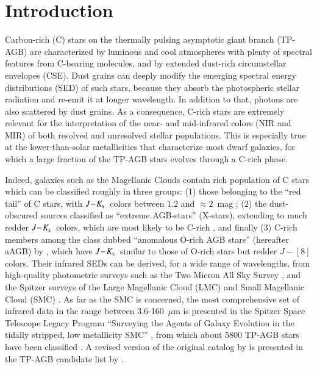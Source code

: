 \documentclass[useAMS,usenatbib]{mn2e/mn2e}
\newcommand{\jks}{\mbox{$J\!-\!K_{\rm s}$}}
\begin{document}
\section{Introduction}
\label{introduction}
Carbon-rich (C) stars on the thermally pulsing asymptotic giant branch (TP-AGB) are characterized by luminous and cool atmospheres with plenty of spectral features from C-bearing molecules, and by extended dust-rich circumstellar envelopes (CSE). Dust grains can deeply modify the emerging spectral energy distributions (SED) of such stars, because they absorb the photospheric stellar radiation and re-emit it at longer wavelength. In addition to that, photons are also scattered by dust grains. As a consequence, C-rich stars are extremely relevant for the interpretation of the near- and mid-infrared colors (NIR and MIR) of both resolved and unresolved stellar populations. This is especially true at the lower-than-solar metallicities that characterize most dwarf galaxies, for which a large fraction of the TP-AGB stars evolves through a C-rich phase.

Indeed, galaxies such as the Magellanic Clouds contain rich population of C stars which can be classified roughly in three groups: (1) those belonging to the ``red tail'' of C stars, with \jks\ colors between $1.2$ and $\approx2$~mag \citep{Cioni06}; (2) the dust-obscured sources classified as ``extreme AGB-stars'' (X-stars), extending to much redder \jks\ colors, which are most likely to be C-rich \citep{vanLoon97, vanLoon06, vanLoon08, Matsuura09}, and finally (3) C-rich members among the class dubbed ``anomalous O-rich AGB stars'' (hereafter aAGB) by \citet{Boyer11}, which have \jks\ similar to those of O-rich stars but redder $J-[8]$ colors. Their infrared SEDs can be derived, for a wide range of wavelengths, from high-quality photometric surveys such as the Two Micron All Sky Survey \citep[2MASS;][]{skrutskie06}, and the Spitzer surveys of the Large Magellanic Cloud (LMC) \citep[SAGE;][]{blum06} and Small Magellanic Cloud (SMC) \citep[S$^{3}$MC;][]{bolatto07}. 
As far as the SMC is concerned, the most comprehensive set of infrared data in the range between 3.6-160~$\mu$m is presented in the Spitzer Space Telescope Legacy Program ``Surveying the Agents of Galaxy Evolution in the tidally stripped, low metallicity SMC'' \citep[SAGE-SMC,][]{gordon11}, from which about 5800 TP-AGB stars have been classified \citep{Boyer11,Boyer15}. A revised version of the original catalog by \citet{Boyer11} is presented in the TP-AGB candidate list by \citet{Srinivasan16}.
\end{document}
